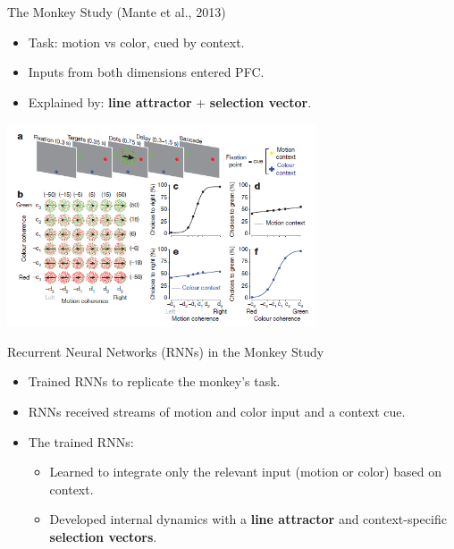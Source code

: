 \documentclass{beamer}
\begin{document}
\begin{frame}{The Monkey Study (Mante et al., 2013)}
    \begin{itemize}
        \item Task: motion vs color, cued by context.
        \item Inputs from both dimensions entered PFC.
        \item Explained by: \textbf{line attractor} + \textbf{selection vector}.
    \end{itemize}
    \begin{minipage}{1\textwidth}
        \centering
        \includegraphics[height=6cm]{monkey_experiment.png}
    \end{minipage}
\end{frame}

\begin{frame}{Recurrent Neural Networks (RNNs) in the Monkey Study}
    \begin{itemize}
        \item Trained RNNs to replicate the monkey's task.
        \item RNNs received streams of motion and color input and a context cue.
        \item The trained RNNs:
        \begin{itemize}
            \item Learned to integrate only the relevant input (motion or color) based on context.
            \item Developed internal dynamics with a \textbf{line attractor} and context-specific \textbf{selection vectors}.
        \end{itemize}
    \end{itemize}
\end{frame}
\end{document}
